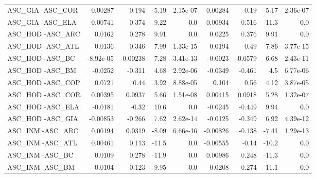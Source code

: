 \begin{tabular}{lrrrrrrrr}
ASC\_GIA -ASC\_COR                        &     0.00287 &        0.194 &   -5.19 & 2.15e-07 &    0.00284 &        0.19 &        -5.17 &      2.36e-07 \\
ASC\_GIA -ASC\_ELA                        &     0.00741 &        0.374 &    9.22 &      0.0 &    0.00934 &       0.516 &         11.3 &           0.0 \\
ASC\_HOD -ASC\_ARC                        &      0.0162 &        0.278 &    9.91 &      0.0 &     0.0225 &       0.376 &         9.91 &           0.0 \\
ASC\_HOD -ASC\_ATL                        &      0.0136 &        0.346 &    7.99 & 1.33e-15 &     0.0194 &        0.49 &         7.86 &      3.77e-15 \\
ASC\_HOD -ASC\_BC                         &   -8.92e-05 &     -0.00238 &    7.28 & 3.41e-13 &    -0.0023 &     -0.0579 &         6.68 &      2.43e-11 \\
ASC\_HOD -ASC\_BM                         &     -0.0252 &       -0.311 &    4.68 & 2.92e-06 &    -0.0349 &      -0.461 &          4.5 &      6.77e-06 \\
ASC\_HOD -ASC\_COP                        &      0.0721 &         0.44 &    3.92 & 8.88e-05 &      0.104 &        0.56 &         4.12 &      3.87e-05 \\
ASC\_HOD -ASC\_COR                        &     0.00395 &       0.0937 &    5.66 & 1.51e-08 &    0.00415 &      0.0918 &         5.28 &      1.32e-07 \\
ASC\_HOD -ASC\_ELA                        &     -0.0181 &        -0.32 &    10.6 &      0.0 &    -0.0245 &      -0.449 &         9.94 &           0.0 \\
ASC\_HOD -ASC\_GIA                        &    -0.00853 &       -0.266 &    7.62 & 2.62e-14 &    -0.0125 &      -0.349 &         6.92 &      4.39e-12 \\
ASC\_INM -ASC\_ARC                        &     0.00194 &       0.0319 &   -8.09 & 6.66e-16 &   -0.00826 &      -0.138 &        -7.41 &      1.29e-13 \\
ASC\_INM -ASC\_ATL                        &     0.00461 &        0.113 &   -11.5 &      0.0 &   -0.00555 &       -0.14 &        -10.2 &           0.0 \\
ASC\_INM -ASC\_BC                         &      0.0109 &        0.278 &   -11.9 &      0.0 &    0.00986 &       0.248 &        -11.3 &           0.0 \\
ASC\_INM -ASC\_BM                         &      0.0104 &        0.123 &   -9.95 &      0.0 &     0.0208 &       0.274 &        -11.1 &           0.0 \\

\end{tabular}
